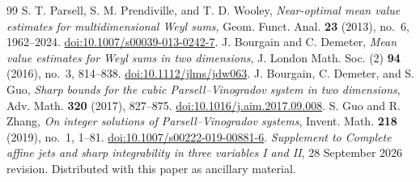 \documentclass[11pt]{amsart}
\theoremstyle{definition}
\theoremstyle{remark}
\numberwithin{equation}{section}
\begin{document}
\begin{thebibliography}{99}
 S. T. Parsell, S. M. Prendiville, and T. D. Wooley, \emph{Near-optimal mean value estimates for multidimensional Weyl sums}, Geom. Funct. Anal. \textbf{23} (2013), no.~6, 1962--2024. \href{https://doi.org/10.1007/s00039-013-0242-7}{doi:10.1007/s00039-013-0242-7}.
 J. Bourgain and C. Demeter, \emph{Mean value estimates for Weyl sums in two dimensions}, J. London Math. Soc. (2) \textbf{94} (2016), no.~3, 814--838. \href{https://doi.org/10.1112/jlms/jdw063}{doi:10.1112/jlms/jdw063}.
 J. Bourgain, C. Demeter, and S. Guo, \emph{Sharp bounds for the cubic Parsell--Vinogradov system in two dimensions}, Adv. Math. \textbf{320} (2017), 827--875. \href{https://doi.org/10.1016/j.aim.2017.09.008}{doi:10.1016/j.aim.2017.09.008}.
 S. Guo and R. Zhang, \emph{On integer solutions of Parsell--Vinogradov systems}, Invent. Math. \textbf{218} (2019), no.~1, 1--81. \href{https://doi.org/10.1007/s00222-019-00881-6}{doi:10.1007/s00222-019-00881-6}.
 \emph{Supplement to Complete affine jets and sharp integrability in three variables I and II}, 28 September 2026 revision. Distributed with this paper as ancillary material.
\end{thebibliography}
\enlargethispage{20pt}
\end{document}
